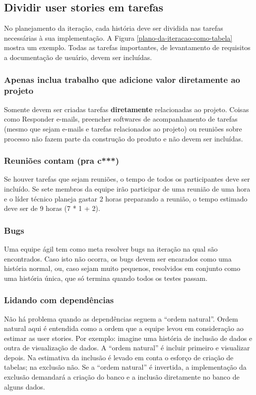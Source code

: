 \documentclass[a4paper,abntfigtabnum,noindentfirst]{abnt}
\begin{document}
\subsection{Dividir user stories em tarefas}

No planejamento da iteração, cada história deve ser dividida nas tarefas necessárias à sua implementação. A Figura \ref{plano-da-iteracao-como-tabela} mostra um exemplo. Todas as tarefas importantes, de levantamento de requisitos a documentação de usuário, devem ser incluídas.

\subsubsection{Apenas inclua trabalho que adicione valor diretamente ao projeto}

Somente devem ser criadas tarefas \textbf{diretamente} relacionadas ao projeto. Coisas como Responder e-mails, preencher softwares de acompanhamento de tarefas (mesmo que sejam e-mails e tarefas relacionados ao projeto) ou reuniões sobre processo não fazem parte da construção do produto e não devem ser incluídas.

\subsubsection{Reuniões contam (pra c***)}

Se houver tarefas que sejam reuniões, o tempo de todos os participantes deve ser incluído. Se sete membros da equipe irão participar de uma reunião de uma hora e o líder técnico planeja gastar 2 horas preparando a reunião, o tempo estimado deve ser de 9 horas (7 * 1 + 2).

\subsubsection{Bugs}

Uma equipe ágil tem como meta resolver bugs na iteração na qual são encontrados. Caso isto não ocorra, os bugs devem ser encarados como uma história normal, ou, caso sejam muito pequenos, resolvidos em conjunto como uma história única, que só termina quando todos os testes passam.

\subsubsection{Lidando com dependências}

Não há problema quando as dependências seguem a ``ordem natural''. Ordem natural aqui é entendida como a ordem que a equipe levou em consideração ao estimar as user stories. Por exemplo: imagine uma história de inclusão de dados e outra de visualização de dados. A ``ordem natural'' é incluir primeiro e visualizar depois. Na estimativa da inclusão é levado em conta o esforço de criação de tabelas; na exclusão não. Se a ``ordem natural'' é invertida, a implementação da exclusão demandará a criação do banco e a inclusão diretamente no banco de alguns dados.
\end{document}
